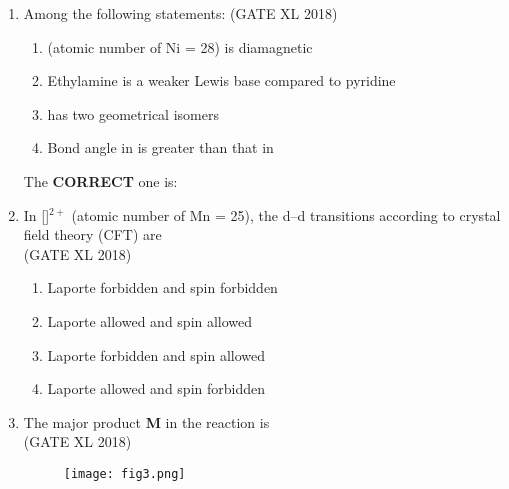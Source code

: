 \documentclass[14pt]{extarticle}
\begin{document}
\begin{flushleft}
\begin{enumerate}
\item Among the following statements: \hfill (GATE XL 2018)\\
\begin{enumerate}[label=(\roman*)]
\item {} (atomic number of Ni = 28) is diamagnetic
\item Ethylamine is a weaker Lewis base compared to pyridine
\item \ce{[NiCl2\{P(C6H5)3\}2]} has two geometrical isomers
\item Bond angle in  is greater than that in 
\end{enumerate}
The \textbf{CORRECT} one is:
\begin{enumerate}
\end{enumerate}

\item In []$^{2+}$ (atomic number of Mn = 25), the d–d transitions according to crystal field theory (CFT) are\\
\hfill (GATE XL 2018)\\
\begin{enumerate}
\item Laporte forbidden and spin forbidden
\item Laporte allowed and spin allowed
\item Laporte forbidden and spin allowed
\item Laporte allowed and spin forbidden
\end{enumerate}

\item The major product \textbf{M} in the reaction is\\
\hfill (GATE XL 2018)\\
\begin{figure}[H]
    \centering
    \texttt{[image: fig3.png]}
    \caption{}
    \label{fig:q9}
\end{figure}
\clearpage   
\begin{enumerate}
\end{enumerate}


\end{enumerate}
\end{flushleft}
\end{document}
